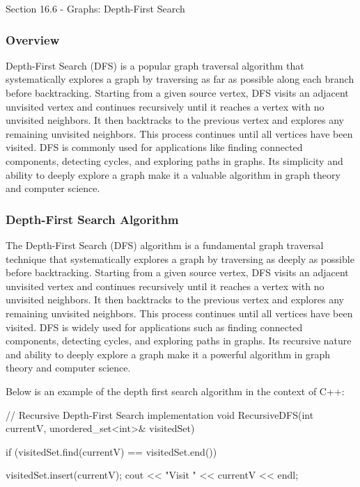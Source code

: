 \begin{notes}{Section 16.6 - Graphs: Depth-First Search}
    \subsubsection*{Overview}

    Depth-First Search (DFS) is a popular graph traversal algorithm that systematically explores a graph by traversing as far as possible along each branch before backtracking. Starting from a given source vertex, DFS visits an adjacent unvisited 
    vertex and continues recursively until it reaches a vertex with no unvisited neighbors. It then backtracks to the previous vertex and explores any remaining unvisited neighbors. This process continues until all vertices have been visited. 
    DFS is commonly used for applications like finding connected components, detecting cycles, and exploring paths in graphs. Its simplicity and ability to deeply explore a graph make it a valuable algorithm in graph theory and computer science.
    
    \subsubsection*{Depth-First Search Algorithm}
    
    The Depth-First Search (DFS) algorithm is a fundamental graph traversal technique that systematically explores a graph by traversing as deeply as possible before backtracking. Starting from a given source vertex, DFS visits an adjacent unvisited 
    vertex and continues recursively until it reaches a vertex with no unvisited neighbors. It then backtracks to the previous vertex and explores any remaining unvisited neighbors. This process continues until all vertices have been visited. DFS is 
    widely used for applications such as finding connected components, detecting cycles, and exploring paths in graphs. Its recursive nature and ability to deeply explore a graph make it a powerful algorithm in graph theory and computer science.
    
    \begin{highlight}
        Below is an example of the depth first search algorithm in the context of C++:
    
    \begin{code}[C++]
    // Recursive Depth-First Search implementation
    void RecursiveDFS(int currentV, unordered_set<int>& visitedSet) {
        if (visitedSet.find(currentV) == visitedSet.end()) {
            visitedSet.insert(currentV);
            cout << "Visit " << currentV << endl;
    
}}
\end{code}
\end{highlight}
\end{notes}
